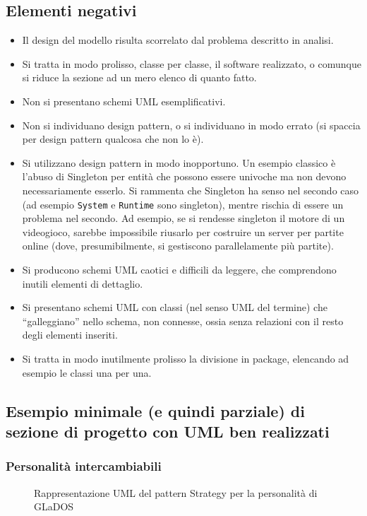 \documentclass[a4paper,12pt]{report}
\begin{document}
\subsection*{Elementi negativi}
\begin{itemize}
	\item Il design del modello risulta scorrelato dal problema descritto in analisi.
	\item Si tratta in modo prolisso, classe per classe, il software realizzato, o comunque si riduce la sezione ad un mero elenco di quanto fatto.
	\item Non si presentano schemi UML esemplificativi.
	\item Non si individuano design pattern, o si individuano in modo errato (si spaccia per design pattern qualcosa che non lo è).
	\item Si utilizzano design pattern in modo inopportuno. Un esempio classico è l'abuso di
Singleton per entità che possono essere univoche ma non devono necessariamente esserlo. Si rammenta
che Singleton ha senso nel secondo caso (ad esempio \texttt{System} e \texttt{Runtime} sono
singleton), mentre rischia di essere un problema nel secondo. Ad esempio, se si rendesse singleton
il motore di un videogioco, sarebbe impossibile riusarlo per costruire un server per partite online
(dove, presumibilmente, si gestiscono parallelamente più partite).
	\item Si producono schemi UML caotici e difficili da leggere, che comprendono inutili elementi di dettaglio.
	\item Si presentano schemi UML con classi (nel senso UML del termine) che ``galleggiano'' nello schema, non connesse, ossia senza relazioni con il resto degli elementi inseriti.
	\item Si tratta in modo inutilmente prolisso la divisione in package, elencando ad esempio le classi una per una.
\end{itemize}

\subsection*{Esempio minimale (e quindi parziale) di sezione di progetto con UML ben realizzati}

\subsubsection{Personalità intercambiabili}

\begin{figure}[H]
\centering{}
\caption{Rappresentazione UML del pattern Strategy per la personalità di GLaDOS}
\label{img:strategy}
\end{figure}
\end{document}
